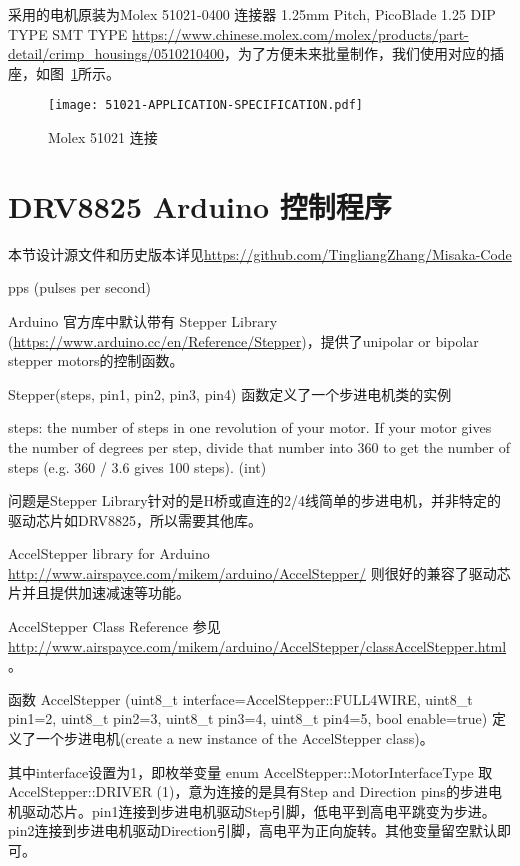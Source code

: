 采用的电机原装为Molex 51021-0400 连接器 1.25mm Pitch, PicoBlade 1.25 DIP TYPE SMT TYPE \url{https://www.chinese.molex.com/molex/products/part-detail/crimp\_housings/0510210400}，为了方便未来批量制作，我们使用对应的插座，如图~\ref{fig:51021-APPLICATION-SPECIFICATION}所示。

\begin{figure}[htbp]
    \centering
    \texttt{[image: 51021-APPLICATION-SPECIFICATION.pdf]}
    \caption{Molex 51021 连接}
    \label{fig:51021-APPLICATION-SPECIFICATION}
\end{figure}


\section{DRV8825 Arduino 控制程序}

本节设计源文件和历史版本详见\url{https://github.com/TingliangZhang/Misaka-Code}

pps (pulses per second)

Arduino 官方库中默认带有 Stepper Library (\url{https://www.arduino.cc/en/Reference/Stepper})，提供了unipolar or bipolar stepper motors的控制函数。

Stepper(steps, pin1, pin2, pin3, pin4) 函数定义了一个步进电机类的实例

steps: the number of steps in one revolution of your motor. If your motor gives the number of degrees per step, divide that number into 360 to get the number of steps (e.g. 360 / 3.6 gives 100 steps). (int)

问题是Stepper Library针对的是H桥或直连的2/4线简单的步进电机，并非特定的驱动芯片如DRV8825，所以需要其他库。

AccelStepper library for Arduino \url{http://www.airspayce.com/mikem/arduino/AccelStepper/} 则很好的兼容了驱动芯片并且提供加速减速等功能。

AccelStepper Class Reference 参见 \url{http://www.airspayce.com/mikem/arduino/AccelStepper/classAccelStepper.html} 。

函数 AccelStepper (uint8\_t interface=AccelStepper::FULL4WIRE, uint8\_t pin1=2, uint8\_t pin2=3, uint8\_t pin3=4, uint8\_t pin4=5, bool enable=true) 定义了一个步进电机(create a new instance of the AccelStepper class)。

其中interface设置为1，即枚举变量 enum AccelStepper::MotorInterfaceType 取AccelStepper::DRIVER (1)，意为连接的是具有Step and Direction pins的步进电机驱动芯片。pin1连接到步进电机驱动Step引脚，低电平到高电平跳变为步进。pin2连接到步进电机驱动Direction引脚，高电平为正向旋转。其他变量留空默认即可。


